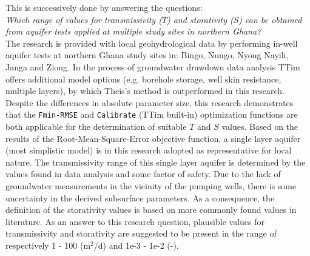 This is successively done by answering the questions: 
\smallskip \\
\textit{Which range of values for transmissivity ($T$) and 
storativity ($S$) can be obtained from aquifer tests applied at multiple study sites in northern Ghana?}
\smallskip \\
The research is provided with local geohydrological data by performing in-well aquifer tests at northern Ghana study sites in: Bingo, Nungo, Nyong Nayili, Janga and Ziong. In the process of groundwater drawdown data analysis TTim offers additional model options (e.g. borehole storage, well skin resistance, multiple layers), by which Theis's method is outperformed in this research. Despite the differences in absolute parameter size, this research demonstrates that the \texttt{Fmin-RMSE} and \texttt{Calibrate} (TTim built-in) optimization functions are both applicable for the determination of suitable $T$ and $S$ values. Based on the results of the Root-Mean-Square-Error objective function, a single layer aquifer (most simplistic model) is in this research adopted as representative for local nature. The transmissivity range of this single layer aquifer is determined by the values found in data analysis and some factor of safety. Due to the lack of groundwater measurements in the vicinity of the pumping wells, there is some uncertainty in the derived subsurface parameters. As a consequence, the definition of the storativity values is based on more commonly found values in literature. As an answer to this research question, plausible values for transmissivity and storativity are suggested to be present in the range of respectively 1 - 100 (m$^2$/d) and 1e-3 - 1e-2 (-). \\

